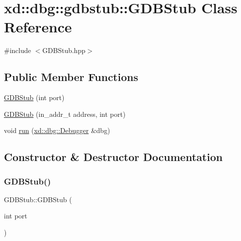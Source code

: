 \hypertarget{classxd_1_1dbg_1_1gdbstub_1_1_g_d_b_stub}{}\section{xd\+:\+:dbg\+:\+:gdbstub\+:\+:G\+D\+B\+Stub Class Reference}
\label{classxd_1_1dbg_1_1gdbstub_1_1_g_d_b_stub}


{\ttfamily \#include $<$G\+D\+B\+Stub.\+hpp$>$}

\subsection*{Public Member Functions}
\begin{DoxyCompactItemize}
\item 
\mbox{\hyperlink{classxd_1_1dbg_1_1gdbstub_1_1_g_d_b_stub_a5fe2d85b6767f8a7aa83758b78cc3996}{G\+D\+B\+Stub}} (int port)
\item 
\mbox{\hyperlink{classxd_1_1dbg_1_1gdbstub_1_1_g_d_b_stub_a999c20469b615a390dca0385bf9b5664}{G\+D\+B\+Stub}} (in\+\_\+addr\+\_\+t address, int port)
\item 
void \mbox{\hyperlink{classxd_1_1dbg_1_1gdbstub_1_1_g_d_b_stub_a43439a2c842fb6e696f87851c09afcd8}{run}} (\mbox{\hyperlink{classxd_1_1dbg_1_1_debugger}{xd\+::dbg\+::\+Debugger}} \&dbg)
\end{DoxyCompactItemize}


\subsection{Constructor \& Destructor Documentation}
\mbox{\label{classxd_1_1dbg_1_1gdbstub_1_1_g_d_b_stub_a5fe2d85b6767f8a7aa83758b78cc3996}} 
\subsubsection{\texorpdfstring{G\+D\+B\+Stub()}{GDBStub()}\hspace{0.1cm}{\footnotesize\ttfamily [1/2]}}
{\footnotesize\ttfamily G\+D\+B\+Stub\+::\+G\+D\+B\+Stub (\begin{DoxyParamCaption}\item[{int}]{port }\end{DoxyParamCaption})}

